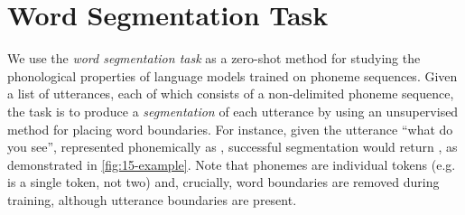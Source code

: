 





\section{Word Segmentation Task}


We use the \emph{word segmentation task} as a zero-shot method for studying the phonological properties of language models trained on phoneme sequences. Given a list of utterances, each of which consists of a non-delimited phoneme sequence, the task is to produce a \emph{segmentation} of each utterance by using an unsupervised method for placing word boundaries. For instance, given the utterance ``what do you see'', represented phonemically as , successful segmentation would return , as demonstrated in \cref{fig:15-example}. Note that phonemes are individual tokens (e.g.  is a single token, not two) and, crucially, word boundaries are removed during training, although utterance boundaries are present.

